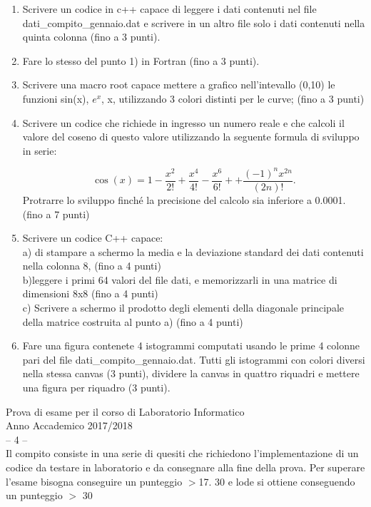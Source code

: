 \documentclass[11pt,fleqn]{book} %
\begin{document}
\begin{enumerate}


\item Scrivere un codice in c++ capace di  leggere i dati contenuti nel file  dati\_compito\_gennaio.dat e scrivere in un altro file solo i dati contenuti nella quinta colonna (fino a 3 punti).

\item Fare lo stesso del punto 1) in Fortran (fino a 3 punti).


\item Scrivere una macro root capace mettere a grafico nell'intevallo (0,10)
le funzioni sin(x), $e^x$, x, utilizzando 3 colori distinti per le curve; (fino a 3  punti)

\item Scrivere un codice che richiede in ingresso un numero reale e che calcoli il valore del coseno di questo valore utilizzando la seguente formula di sviluppo in serie:\vspace{-0.5 cm}

$$ \cos(x) =  1 - \frac{x^2}{2!} + \frac{x^4}{4!} - \frac{x^6}{6!} + + \frac{(-1)^{n}x^{2n}}{(2n)!}.
$$
Protrarre lo sviluppo finché la precisione del calcolo sia inferiore a 0.0001. (fino a 7 punti)  

\item Scrivere un codice C++ capace:\\
     a) di stampare a schermo la media e la deviazione standard dei dati contenuti nella  colonna 8, (fino a 4 punti) \\
     b)leggere i primi 64 valori del file dati, e memorizzarli in una matrice di dimensioni 8x8   (fino a 4 punti)\\
     c) Scrivere a schermo il prodotto degli elementi della diagonale principale della matrice costruita al punto a) (fino a 4 punti)


\item Fare una figura contenete 4 istogrammi computati usando le prime 4 colonne pari del file  dati\_compito\_gennaio.dat. Tutti gli istogrammi con colori diversi nella stessa canvas (3 punti), dividere la canvas in quattro riquadri e mettere una figura per riquadro (3 punti).


\end{enumerate}




\newpage
\thispagestyle{empty}
{
\Large\centering
Prova di esame per il corso di Laboratorio Informatico\\		
Anno Accademico 2017/2018\\
-- 4 --\\
}
{
\small\centering
Il compito consiste in una serie di quesiti che richiedono l’implementazione di un codice da testare in laboratorio e da consegnare alla fine della prova. Per superare l’esame bisogna conseguire un punteggio $>$17.  
30 e lode si ottiene conseguendo un punteggio $>$ 30
}
\end{document}
